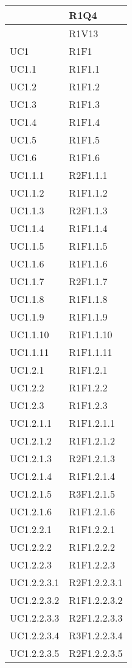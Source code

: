 \begin{longtable}{|>{\centering}m{5cm}|m{5cm}<{\centering}|}
{Verbale 2016-12-23}&{R1Q4}\\ \hline
{Verbale_2\_E\_2017-02-24}&{R1V13}\\ \hline
{UC1}&{R1F1}\\ \hline
{UC1.1}&{R1F1.1}\\ \hline
{UC1.2}&{R1F1.2}\\ \hline
{UC1.3}&{R1F1.3}\\ \hline
{UC1.4}&{R1F1.4}\\ \hline
{UC1.5}&{R1F1.5}\\ \hline
{UC1.6}&{R1F1.6}\\ \hline
{UC1.1.1}&{R2F1.1.1}\\ \hline
{UC1.1.2}&{R1F1.1.2}\\ \hline
{UC1.1.3}&{R2F1.1.3}\\ \hline
{UC1.1.4}&{R1F1.1.4}\\ \hline
{UC1.1.5}&{R1F1.1.5}\\ \hline
{UC1.1.6}&{R1F1.1.6}\\ \hline
{UC1.1.7}&{R2F1.1.7}\\ \hline
{UC1.1.8}&{R1F1.1.8}\\ \hline
{UC1.1.9}&{R1F1.1.9}\\ \hline
{UC1.1.10}&{R1F1.1.10}\\ \hline
{UC1.1.11}&{R1F1.1.11}\\ \hline
{UC1.2.1}&{R1F1.2.1}\\ \hline
{UC1.2.2}&{R1F1.2.2}\\ \hline
{UC1.2.3}&{R1F1.2.3}\\ \hline
{UC1.2.1.1}&{R1F1.2.1.1}\\ \hline
{UC1.2.1.2}&{R1F1.2.1.2}\\ \hline
{UC1.2.1.3}&{R2F1.2.1.3}\\ \hline
{UC1.2.1.4}&{R1F1.2.1.4}\\ \hline
{UC1.2.1.5}&{R3F1.2.1.5}\\ \hline
{UC1.2.1.6}&{R1F1.2.1.6}\\ \hline
{UC1.2.2.1}&{R1F1.2.2.1}\\ \hline
{UC1.2.2.2}&{R1F1.2.2.2}\\ \hline
{UC1.2.2.3}&{R1F1.2.2.3}\\ \hline
{UC1.2.2.3.1}&{R2F1.2.2.3.1}\\ \hline
{UC1.2.2.3.2}&{R1F1.2.2.3.2}\\ \hline
{UC1.2.2.3.3}&{R2F1.2.2.3.3}\\ \hline
{UC1.2.2.3.4}&{R3F1.2.2.3.4}\\ \hline
{UC1.2.2.3.5}&{R2F1.2.2.3.5}\\ \hline

\end{longtable}
